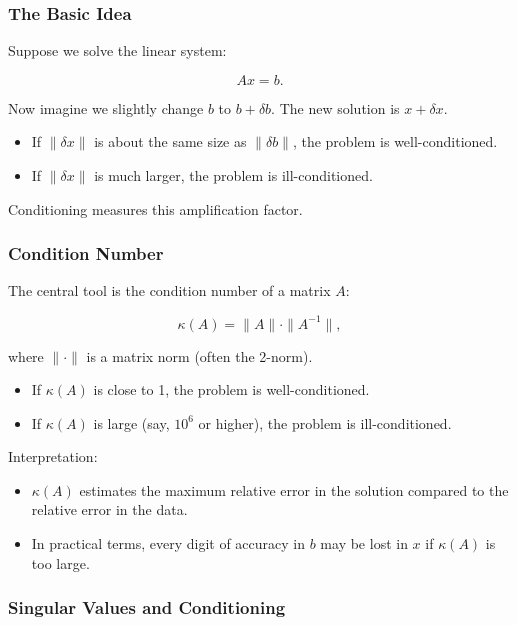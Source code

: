 \documentclass[
  letterpaper,
  DIV=11,
  numbers=noendperiod]{scrreprt}
\providecommand{\tightlist}{%
  \setlength{\itemsep}{0pt}\setlength{\parskip}{0pt}}
\begin{document}
\subsubsection{The Basic Idea}\label{the-basic-idea}

Suppose we solve the linear system:

\[
Ax = b.
\]

Now imagine we slightly change \(b\) to \(b + \delta b\). The new
solution is \(x + \delta x\).

\begin{itemize}
\tightlist
\item
  If \(\|\delta x\|\) is about the same size as \(\|\delta b\|\), the
  problem is well-conditioned.
\item
  If \(\|\delta x\|\) is much larger, the problem is ill-conditioned.
\end{itemize}

Conditioning measures this amplification factor.

\subsubsection{Condition Number}\label{condition-number}

The central tool is the condition number of a matrix \(A\):

\[
\kappa(A) = \|A\| \cdot \|A^{-1}\|,
\]

where \(\|\cdot\|\) is a matrix norm (often the 2-norm).

\begin{itemize}
\tightlist
\item
  If \(\kappa(A)\) is close to 1, the problem is well-conditioned.
\item
  If \(\kappa(A)\) is large (say, \(10^6\) or higher), the problem is
  ill-conditioned.
\end{itemize}

Interpretation:

\begin{itemize}
\tightlist
\item
  \(\kappa(A)\) estimates the maximum relative error in the solution
  compared to the relative error in the data.
\item
  In practical terms, every digit of accuracy in \(b\) may be lost in
  \(x\) if \(\kappa(A)\) is too large.
\end{itemize}

\subsubsection{Singular Values and
Conditioning}\label{singular-values-and-conditioning}
\end{document}
